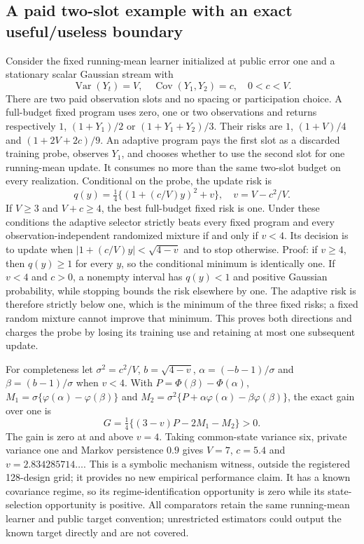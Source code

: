 \subsection{A paid two-slot example with an exact useful/useless boundary}
Consider the fixed running-mean learner initialized at public error one and a stationary scalar Gaussian stream with
\[
\operatorname{Var}(Y_t)=V,\quad \operatorname{Cov}(Y_1,Y_2)=c,\quad 0<c<V.
\]
There are two paid observation slots and no spacing or participation choice.
A full-budget fixed program uses zero, one or two observations and returns respectively $1$, $(1+Y_1)/2$ or $(1+Y_1+Y_2)/3$.
Their risks are $1$, $(1+V)/4$ and $(1+2V+2c)/9$.
An adaptive program pays the first slot as a discarded training probe, observes $Y_1$, and chooses whether to use the second slot for one running-mean update.
It consumes no more than the same two-slot budget on every realization.
Conditional on the probe, the update risk is
\[
q(y)=\tfrac14\{(1+(c/V)y)^2+v\},\quad v=V-c^2/V.
\]
If $V\ge3$ and $V+c\ge4$, the best full-budget fixed risk is one.
Under these conditions the adaptive selector strictly beats every fixed program and every observation-independent randomized mixture if and only if $v<4$.
Its decision is to update when $|1+(c/V)y|<\sqrt{4-v}$ and to stop otherwise.
Proof: if $v\ge4$, then $q(y)\ge1$ for every $y$, so the conditional minimum is identically one.
If $v<4$ and $c>0$, a nonempty interval has $q(y)<1$ and positive Gaussian probability, while stopping bounds the risk elsewhere by one.
The adaptive risk is therefore strictly below one, which is the minimum of the three fixed risks; a fixed random mixture cannot improve that minimum.
This proves both directions and charges the probe by losing its training use and retaining at most one subsequent update.

For completeness let $\sigma^2=c^2/V$, $b=\sqrt{4-v}$, $\alpha=(-b-1)/\sigma$ and $\beta=(b-1)/\sigma$ when $v<4$.
With $P=\Phi(\beta)-\Phi(\alpha)$, $M_1=\sigma\{\varphi(\alpha)-\varphi(\beta)\}$ and $M_2=\sigma^2\{P+\alpha\varphi(\alpha)-\beta\varphi(\beta)\}$, the exact gain over one is
\[
G=\tfrac14\{(3-v)P-2M_1-M_2\}>0.
\]
The gain is zero at and above $v=4$.
Taking common-state variance six, private variance one and Markov persistence $0.9$ gives $V=7$, $c=5.4$ and $v=2.834285714\ldots$.
This is a symbolic mechanism witness, outside the registered 128-design grid; it provides no new empirical performance claim.
It has a known covariance regime, so its regime-identification opportunity is zero while its state-selection opportunity is positive.
All comparators retain the same running-mean learner and public target convention; unrestricted estimators could output the known target directly and are not covered.

